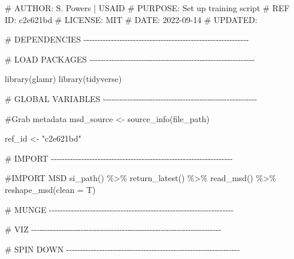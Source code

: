 \documentclass[
  letterpaper,
  DIV=11,
  numbers=noendperiod]{scrreprt}
\newenvironment{Shaded}{\begin{snugshade}}{\end{snugshade}}
\newcommand{\AttributeTok}[1]{\textcolor[rgb]{0.40,0.45,0.13}{#1}}
\newcommand{\CommentTok}[1]{\textcolor[rgb]{0.37,0.37,0.37}{#1}}
\newcommand{\FunctionTok}[1]{\textcolor[rgb]{0.28,0.35,0.67}{#1}}
\newcommand{\NormalTok}[1]{\textcolor[rgb]{0.00,0.23,0.31}{#1}}
\newcommand{\OtherTok}[1]{\textcolor[rgb]{0.00,0.23,0.31}{#1}}
\newcommand{\SpecialCharTok}[1]{\textcolor[rgb]{0.37,0.37,0.37}{#1}}
\newcommand{\StringTok}[1]{\textcolor[rgb]{0.13,0.47,0.30}{#1}}
\begin{document}
\begin{Shaded}
\begin{Highlighting}[]
\CommentTok{\# AUTHOR:   S. Powers | USAID}
\CommentTok{\# PURPOSE:  Set up training script}
\CommentTok{\# REF ID:   c2e621bd }
\CommentTok{\# LICENSE:  MIT}
\CommentTok{\# DATE:     2022{-}09{-}14}
\CommentTok{\# UPDATED: }

\CommentTok{\# DEPENDENCIES {-}{-}{-}{-}{-}{-}{-}{-}{-}{-}{-}{-}{-}{-}{-}{-}{-}{-}{-}{-}{-}{-}{-}{-}{-}{-}{-}{-}{-}{-}{-}{-}{-}{-}{-}{-}{-}{-}{-}{-}{-}{-}{-}{-}{-}{-}{-}{-}{-}{-}{-}{-}{-}{-}{-}{-}{-}{-}{-}{-}}
  
\CommentTok{\# LOAD PACKAGES {-}{-}{-}{-}{-}{-}{-}{-}{-}{-}{-}{-}{-}{-}{-}{-}{-}{-}{-}{-}{-}{-}{-}{-}{-}{-}{-}{-}{-}{-}{-}{-}{-}{-}{-}{-}{-}{-}{-}{-}{-}{-}{-}{-}{-}{-}{-}{-}{-}{-}{-}{-}{-}{-}{-}{-}{-}{-}{-}{-}}

  \FunctionTok{library}\NormalTok{(glamr)}
  \FunctionTok{library}\NormalTok{(tidyverse)}
  

\CommentTok{\# GLOBAL VARIABLES {-}{-}{-}{-}{-}{-}{-}{-}{-}{-}{-}{-}{-}{-}{-}{-}{-}{-}{-}{-}{-}{-}{-}{-}{-}{-}{-}{-}{-}{-}{-}{-}{-}{-}{-}{-}{-}{-}{-}{-}{-}{-}{-}{-}{-}{-}{-}{-}{-}{-}{-}{-}{-}{-}{-}{-}}
    
  \CommentTok{\#Grab metadata}
\NormalTok{  msd\_source }\OtherTok{\textless{}{-}} \FunctionTok{source\_info}\NormalTok{(file\_path)}
  
\NormalTok{  ref\_id }\OtherTok{\textless{}{-}} \StringTok{"c2e621bd"}

\CommentTok{\# IMPORT {-}{-}{-}{-}{-}{-}{-}{-}{-}{-}{-}{-}{-}{-}{-}{-}{-}{-}{-}{-}{-}{-}{-}{-}{-}{-}{-}{-}{-}{-}{-}{-}{-}{-}{-}{-}{-}{-}{-}{-}{-}{-}{-}{-}{-}{-}{-}{-}{-}{-}{-}{-}{-}{-}{-}{-}{-}{-}{-}{-}{-}{-}{-}{-}{-}{-}}
  
  \CommentTok{\#IMPORT MSD}
  \FunctionTok{si\_path}\NormalTok{() }\SpecialCharTok{\%\textgreater{}\%} 
    \FunctionTok{return\_latest}\NormalTok{() }\SpecialCharTok{\%\textgreater{}\%} 
    \FunctionTok{read\_msd}\NormalTok{() }\SpecialCharTok{\%\textgreater{}\%} 
    \FunctionTok{reshape\_msd}\NormalTok{(}\AttributeTok{clean =}\NormalTok{ T)}
  

\CommentTok{\# MUNGE {-}{-}{-}{-}{-}{-}{-}{-}{-}{-}{-}{-}{-}{-}{-}{-}{-}{-}{-}{-}{-}{-}{-}{-}{-}{-}{-}{-}{-}{-}{-}{-}{-}{-}{-}{-}{-}{-}{-}{-}{-}{-}{-}{-}{-}{-}{-}{-}{-}{-}{-}{-}{-}{-}{-}{-}{-}{-}{-}{-}{-}{-}{-}{-}{-}{-}{-}}
  
\CommentTok{\# VIZ {-}{-}{-}{-}{-}{-}{-}{-}{-}{-}{-}{-}{-}{-}{-}{-}{-}{-}{-}{-}{-}{-}{-}{-}{-}{-}{-}{-}{-}{-}{-}{-}{-}{-}{-}{-}{-}{-}{-}{-}{-}{-}{-}{-}{-}{-}{-}{-}{-}{-}{-}{-}{-}{-}{-}{-}{-}{-}{-}{-}{-}{-}{-}{-}{-}{-}{-}{-}{-}}
  
\CommentTok{\# SPIN DOWN {-}{-}{-}{-}{-}{-}{-}{-}{-}{-}{-}{-}{-}{-}{-}{-}{-}{-}{-}{-}{-}{-}{-}{-}{-}{-}{-}{-}{-}{-}{-}{-}{-}{-}{-}{-}{-}{-}{-}{-}{-}{-}{-}{-}{-}{-}{-}{-}{-}{-}{-}{-}{-}{-}{-}{-}{-}{-}{-}{-}{-}{-}{-}}
\end{Highlighting}
\end{Shaded}
\end{document}
